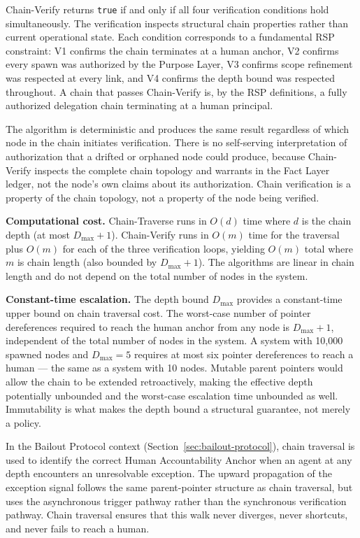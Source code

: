 Chain-Verify returns \texttt{true} if and only if all four verification conditions hold simultaneously. The verification inspects structural chain properties rather than current operational state. Each condition corresponds to a fundamental RSP constraint: V1 confirms the chain terminates at a human anchor, V2 confirms every spawn was authorized by the Purpose Layer, V3 confirms scope refinement was respected at every link, and V4 confirms the depth bound was respected throughout. A chain that passes Chain-Verify is, by the RSP definitions, a fully authorized delegation chain terminating at a human principal.

The algorithm is deterministic and produces the same result regardless of which node in the chain initiates verification. There is no self-serving interpretation of authorization that a drifted or orphaned node could produce, because Chain-Verify inspects the complete chain topology and warrants in the Fact Layer ledger, not the node's own claims about its authorization. Chain verification is a property of the chain topology, not a property of the node being verified.

\bigskip
\noindent\textbf{Computational cost.} Chain-Traverse runs in $O(d)$ time where $d$ is the chain depth (at most $D_{\max} + 1$). Chain-Verify runs in $O(m)$ time for the traversal plus $O(m)$ for each of the three verification loops, yielding $O(m)$ total where $m$ is chain length (also bounded by $D_{\max} + 1$). The algorithms are linear in chain length and do not depend on the total number of nodes in the system.

\bigskip
\noindent\textbf{Constant-time escalation.} The depth bound $D_{\max}$ provides a constant-time upper bound on chain traversal cost. The worst-case number of pointer dereferences required to reach the human anchor from any node is $D_{\max} + 1$, independent of the total number of nodes in the system. A system with 10,000 spawned nodes and $D_{\max} = 5$ requires at most six pointer dereferences to reach a human --- the same as a system with 10 nodes. Mutable parent pointers would allow the chain to be extended retroactively, making the effective depth potentially unbounded and the worst-case escalation time unbounded as well. Immutability is what makes the depth bound a structural guarantee, not merely a policy.

In the Bailout Protocol context (Section~\ref{sec:bailout-protocol}), chain traversal is used to identify the correct Human Accountability Anchor when an agent at any depth encounters an unresolvable exception. The upward propagation of the exception signal follows the same parent-pointer structure as chain traversal, but uses the asynchronous trigger pathway rather than the synchronous verification pathway. Chain traversal ensures that this walk never diverges, never shortcuts, and never fails to reach a human.

